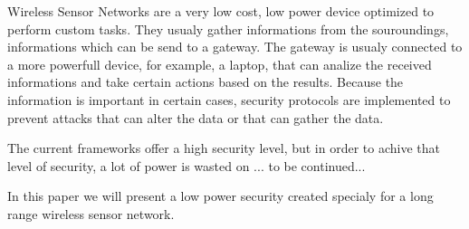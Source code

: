 Wireless Sensor Networks are a very low cost, low power device optimized to perform custom tasks. They usualy gather informations from the souroundings, informations which can be send to a gateway. The gateway is usualy connected to a more powerfull device, for example, a laptop, that can analize the received informations and take certain actions based on the results. Because the information is important in certain cases, security protocols are implemented to prevent attacks that can alter the data or that can gather the data.

The current frameworks offer a high security level, but in order to achive that level of security, a lot of power is wasted on ... to be continued...

In this paper we will present a low power security created specialy for a long range wireless sensor network.
